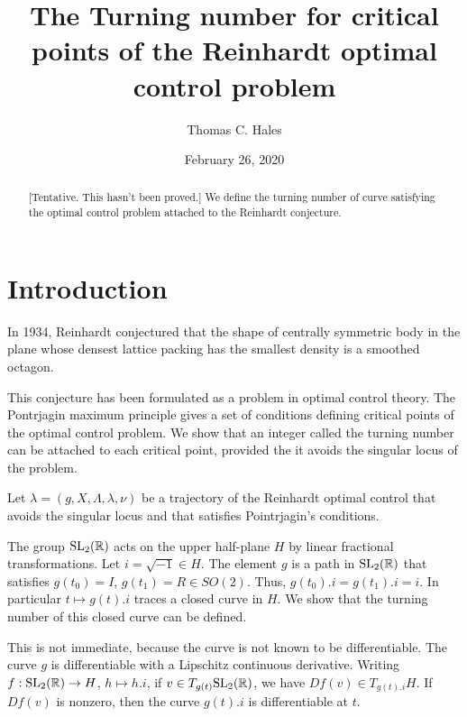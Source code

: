 \documentclass{article}
\title{The Turning number for critical points of the Reinhardt optimal control problem}
\author{Thomas C. Hales}
\date{}
\date{February 26, 2020}
\theoremstyle{remark}
\newcommand{\ring}[1]{\mathbb{#1}}
\newcommand{\op}[1]{\hbox{#1}}
\def\SL{\op{SL}_2(\ring{R})}
\begin{document}
\maketitle


\begin{abstract} [Tentative. This hasn't been proved.] We define the turning number of curve
satisfying the optimal control problem attached to the Reinhardt conjecture.
 \end{abstract}

\baselineskip
{}\baselineskip

\newenvironment{blockquote}{%
  \par%
  \medskip%
  \baselineskip=0.7\baselineskip%
  \leftskip=2em\rightskip=2em%
  \noindent\ignorespaces}{%
  \par\medskip}

\section{Introduction}

In 1934, Reinhardt conjectured that the shape of centrally symmetric
body in the plane whose densest lattice packing has the smallest
density is a smoothed octagon.  

This conjecture has been formulated as a problem in optimal control theory.
The Pontrjagin maximum principle gives a set of conditions defining critical
points of the optimal control problem.  We show that an integer called the turning number can
be attached to each critical point, provided the it avoids the singular locus
of the problem.

Let $\lambda=(g,X,\Lambda,\lambda,\nu)$ be a trajectory of the
Reinhardt optimal control that avoids the singular locus and that
satisfies Pointrjagin's conditions.    

The group $\SL$ acts on the upper half-plane $H$ by linear fractional transformations.
Let $i = \sqrt{-1}\in H$. 
The element $g$ is a path in $\SL$ that satisfies $g(t_0) =I$, $g(t_1)=R\in SO(2)$.
Thus, $g(t_0).i = g(t_1).i = i$.  In particular $t\mapsto g(t).i$ traces a closed curve in $H$.
We show that the turning number of this closed curve can be defined.  

This is not immediate, because
the curve is not known to be differentiable. 
The curve $g$ is differentiable with a Lipschitz continuous derivative.   
Writing $f:\SL\to H$, $h\mapsto h.i$, if $v \in T_{g(t)} \SL$, we have
$Df(v) \in T_{g(t).i} H$.  If $Df(v)$ is nonzero, then the curve $g(t).i$ is differentiable at $t$.
\end{document}
